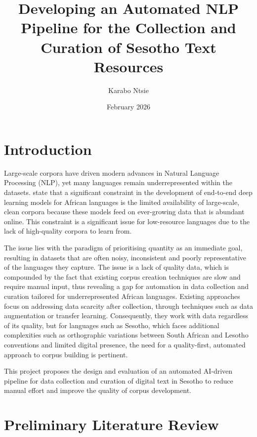 \documentclass[11pt,a4paper]{article}
\begin{document}
	
\title{Developing an Automated NLP Pipeline for the Collection and Curation of Sesotho Text Resources }
\author{ Karabo Ntsie }
\date { February 2026}
\maketitle  


\section{Introduction}
\label{sec:intro}

Large-scale corpora have driven modern advances in Natural Language Processing (NLP),
yet many languages remain underrepresented within the datasets. \citet{Mishra2020} state that a significant constraint in the development of end-to-end deep learning models for African languages is the limited availability of large-scale, clean corpora because these models feed on ever-growing data that is abundant online. This constraint is a significant issue for low-resource languages due to the lack of high-quality corpora to learn from.

The issue lies with the paradigm of prioritising quantity as an immediate goal, resulting in datasets that are often noisy, inconsistent and poorly representative of the languages they capture. The issue is a lack of quality data, which is compounded by the fact that existing corpus creation techniques are slow and require manual input, thus revealing a gap for automation in data collection and curation tailored for underrepresented African languages. Existing approaches focus on addressing data scarcity after collection, through techniques such as data augmentation or transfer learning. Consequently, they work with data regardless of its quality, but for languages such as Sesotho, which faces additional complexities such as orthographic variations between South African and Lesotho conventions and limited digital presence, the need for a quality-first, automated approach to corpus building is pertinent.

This project proposes the design and evaluation of an automated AI-driven pipeline for data collection and curation of digital text in Sesotho to reduce manual effort and improve the quality of corpus development.


\section{Preliminary Literature Review}
\label{sec:review}
\end{document}
